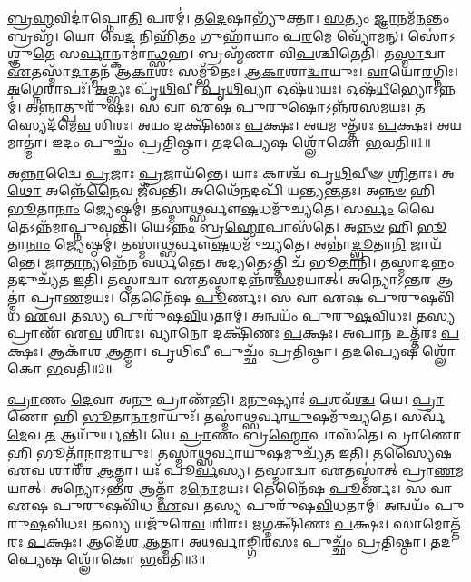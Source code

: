 \-\ul{𑌬𑍍𑌰}\-\-\ul{𑌹𑍍𑌮}\-𑌵𑌿𑌦𑌾॑𑌪𑍍𑌨𑍋\-\ul{𑌤𑌿} 𑌪𑌰𑌮𑍍॑। 
𑌤\-\ul{𑌦𑍇}\-𑌷𑌾𑌭𑍍𑌯𑍁᳴𑌕𑍍𑌤𑌾। 
\-\ul{𑌸}\-𑌤𑍍𑌯𑌂 \ul{𑌜𑍍𑌞𑌾}\-𑌨𑌮᳴\-\-\ul{𑌨}\-𑌨𑍍𑌤𑌂 𑌬𑍍𑌰𑌹𑍍𑌮᳴। 
𑌯𑍋 𑌵𑍇\-\ul{𑌦} 𑌨𑌿𑌹𑌿᳴\-\ul{𑌤𑌂} 𑌗𑍁𑌹𑌾᳴𑌯𑌾𑌂 𑌪\-\ul{𑌰}\-𑌮𑍇 𑌵𑍍𑌯𑍋᳴𑌮𑌨𑍍। 
𑌸𑍋॑𑌽𑌶𑍍𑌞𑍁\-\ul{𑌤𑍇} 𑌸\-\ul{𑌰𑍍𑌵𑌾}\-𑌨𑍍𑌕𑌾𑌮𑌾॑\-\ul{𑌨𑍍𑌥𑍍𑌸}\-𑌹। 
𑌬𑍍𑌰𑌹𑍍𑌮᳴𑌣𑌾 𑌵𑌿\-\-\ul{𑌪}\-𑌶𑍍𑌚𑌿𑌤𑍇𑌤𑌿᳴। 
𑌤\-\ul{𑌸𑍍𑌮𑌾}\-𑌦𑍍𑌵𑌾 \ul{𑌏}\-𑌤𑌸𑍍𑌮𑌾᳴\-\-\ul{𑌦𑌾}\-𑌤𑍍𑌮𑌨᳴ 𑌆\-\ul{𑌕𑌾}\-𑌶𑌃 𑌸𑌮𑍍𑌭𑍂᳴𑌤𑌃। 
\-\ul{𑌆}\-\-\ul{𑌕𑌾}\-𑌶𑌾\-\ul{𑌦𑍍𑌵𑌾}\-𑌯𑍁𑌃। 
\-\ul{𑌵𑌾}\-𑌯𑍋\-\ul{𑌰}\-𑌗𑍍𑌨𑌿𑌃। 
\-\ul{𑌅}\-𑌗𑍍𑌨𑍇𑌰𑌾𑌪𑌃᳴। 
\-\ul{𑌅}\-𑌦𑍍𑌭𑍍𑌯𑌃 𑌪𑍃᳴\-\ul{𑌥𑌿}\-𑌵𑍀। 
\-\ul{𑌪𑍃}\-\-\ul{𑌥𑌿}\-𑌵𑍍𑌯𑌾 𑌓𑌷᳴𑌧𑌯𑌃। 
𑌓𑌷᳴\-\ul{𑌧𑍀}\-𑌭𑍍𑌯𑍋\-𑌽\-𑌨𑍍𑌨𑌮𑍍॑। 
𑌅\-\ul{𑌨𑍍𑌨𑌾}\-𑌤𑍍𑌪𑍁𑌰𑍁᳴𑌷𑌃। 
𑌸 𑌵𑌾 𑌏𑌷 𑌪𑍁𑌰𑍁𑌷𑍋\-𑌽𑌨𑍍𑌨᳴\-𑌰\-\ul{𑌸}\-𑌮𑌯𑌃। 
𑌤𑌸𑍍𑌯𑍇𑌦᳴\-𑌮𑍇\-\ul{𑌵} 𑌶𑌿𑌰𑌃। 
𑌅𑌯𑌂 𑌦𑌕𑍍𑌷𑌿᳴𑌣𑌃 \ul{𑌪}\-𑌕𑍍𑌷𑌃। 
𑌅𑌯𑌮𑍁𑌤𑍍𑌤᳴𑌰𑌃 \ul{𑌪}\-𑌕𑍍𑌷𑌃। 
𑌅𑌯𑌮𑌾𑌤𑍍𑌮𑌾॑। 
𑌇𑌦𑌂 𑌪𑍁𑌚𑍍𑌛𑌂᳴ 𑌪𑍍𑌰𑌤𑌿\-॒𑌷𑍍𑌠𑌾। 
𑌤𑌦𑌪𑍍𑌯𑍇𑌷 𑌶𑍍𑌲𑍋᳴𑌕𑍋 \ul{𑌭}\-𑌵𑌤𑌿॥1॥

𑌅\-\ul{𑌨𑍍𑌨𑌾}\-𑌦𑍍𑌵𑍈 \ul{𑌪𑍍𑌰}\-𑌜𑌾𑌃 \ul{𑌪𑍍𑌰}\-𑌜𑌾𑌯᳴𑌨𑍍𑌤𑍇। 
𑌯𑌾𑌃 𑌕𑌾𑌶𑍍𑌚᳴ 𑌪𑍃\-\ul{𑌥𑌿}\-𑌵𑍀𑍟 \ul{𑌶𑍍𑌰𑌿}\-𑌤𑌾𑌃। 
𑌅\-\ul{𑌥𑍋} 𑌅𑌨𑍍𑌨𑍇᳴\-\ul{𑌨𑍈}\-𑌵 𑌜𑍀᳴𑌵𑌨𑍍𑌤𑌿। 
𑌅𑌥𑍈᳴\-\ul{𑌨}\-𑌦𑌪𑌿᳴ 𑌯𑌨𑍍𑌤𑍍𑌯\-\ul{𑌨𑍍𑌤}\-𑌤𑌃। 
𑌅\-\ul{𑌨𑍍𑌨}\-\-\ul{𑍞} 𑌹𑌿 \ul{𑌭𑍂}\-𑌤𑌾\-\ul{𑌨𑌾𑌂} 𑌜𑍍𑌯𑍇𑌷𑍍𑌠𑌮𑍍॑। 
𑌤𑌸𑍍𑌮𑌾॑𑌥𑍍𑌸𑌰𑍍𑌵𑍗\-\ul{𑌷}\-𑌧𑌮𑍁᳴𑌚𑍍𑌯𑌤𑍇। 
𑌸\-\ul{𑌰𑍍𑌵𑌂} 𑌵𑍈 𑌤𑍇𑌽𑌨𑍍𑌨᳴𑌮𑌾𑌪𑍍𑌨𑍁𑌵𑌨𑍍𑌤𑌿। 
𑌯𑍇𑌽\-\ul{𑌨𑍍𑌨𑌂} 𑌬𑍍𑌰\-\ul{𑌹𑍍𑌮𑍋}\-𑌪𑌾𑌸᳴𑌤𑍇। 
𑌅\-\ul{𑌨𑍍𑌨}\-\-\ul{𑍞} 𑌹𑌿 \ul{𑌭𑍂}\-𑌤𑌾\-\ul{𑌨𑌾𑌂} 𑌜𑍍𑌯𑍇𑌷𑍍𑌠𑌮𑍍॑। 
𑌤𑌸𑍍𑌮𑌾॑𑌥𑍍𑌸𑌰𑍍𑌵𑍗\-\ul{𑌷}\-𑌧𑌮𑍁᳴𑌚𑍍𑌯𑌤𑍇। 
𑌅𑌨𑍍𑌨𑌾॑\-\ul{𑌦𑍍𑌭𑍂}\-𑌤𑌾\-\ul{𑌨𑌿} 𑌜𑌾𑌯᳴𑌨𑍍𑌤𑍇। 
𑌜𑌾\-\ul{𑌤𑌾}\-𑌨𑍍𑌯𑌨𑍍𑌨𑍇᳴𑌨 𑌵𑌰𑍍𑌧𑌨𑍍𑌤𑍇। 
𑌅𑌦𑍍𑌯𑌤𑍇𑌽𑌤𑍍𑌤𑌿 𑌚᳴ 𑌭𑍂\-\ul{𑌤𑌾}\-𑌨𑌿। 
𑌤𑌸𑍍𑌮𑌾𑌦𑌨𑍍𑌨𑌂 𑌤𑌦𑍁𑌚𑍍𑌯᳴𑌤 \ul{𑌇}\-𑌤𑌿। 
𑌤𑌸𑍍𑌮𑌾𑌦𑍍𑌵𑌾 𑌏𑌤𑌸𑍍𑌮𑌾𑌦𑌨𑍍𑌨᳴𑌰\-\ul{𑌸}\-𑌮𑌯𑌾𑌤𑍍। 
𑌅𑌨𑍍𑌯𑍋𑌽𑌨𑍍𑌤𑌰 𑌆𑌤𑍍𑌮𑌾॑ 𑌪𑍍𑌰𑌾\-\ul{𑌣}\-𑌮𑌯𑌃। 
𑌤𑍇𑌨𑍈᳴𑌷 \ul{𑌪𑍂}\-𑌰𑍍𑌣𑌃। 
𑌸 𑌵𑌾 𑌏𑌷 𑌪𑍁𑌰𑍁𑌷𑌵𑌿᳴𑌧 \ul{𑌏}\-𑌵। 
𑌤𑌸𑍍𑌯 𑌪𑍁𑌰𑍁᳴𑌷\-\ul{𑌵𑌿}\-𑌧𑌤𑌾𑌮𑍍। 
𑌅𑌨𑍍𑌵𑌯𑌂᳴ 𑌪𑍁𑌰𑍁\-\ul{𑌷}\-𑌵𑌿𑌧𑌃। 
𑌤𑌸𑍍𑌯 𑌪𑍍𑌰𑌾𑌣᳴ 𑌏\-\ul{𑌵} 𑌶𑌿𑌰𑌃। 
𑌵𑍍𑌯𑌾𑌨𑍋 𑌦𑌕𑍍𑌷𑌿᳴𑌣𑌃 \ul{𑌪}\-𑌕𑍍𑌷𑌃। 
𑌅𑌪𑌾𑌨 𑌉𑌤𑍍𑌤᳴𑌰𑌃 \ul{𑌪}\-𑌕𑍍𑌷𑌃। 
𑌆𑌕𑌾᳴𑌶 \ul{𑌆}\-𑌤𑍍𑌮𑌾। 
𑌪𑍃𑌥𑌿𑌵𑍀 𑌪𑍁𑌚𑍍𑌛𑌂᳴ 𑌪𑍍𑌰𑌤𑌿\-॒𑌷𑍍𑌠𑌾। 
𑌤𑌦𑌪𑍍𑌯𑍇𑌷 𑌶𑍍𑌲𑍋᳴𑌕𑍋 \ul{𑌭}\-𑌵𑌤𑌿॥2॥

\-\ul{𑌪𑍍𑌰𑌾}\-𑌣𑌂 \ul{𑌦𑍇}\-𑌵𑌾 𑌅\-\ul{𑌨𑍁} 𑌪𑍍𑌰𑌾𑌣᳴𑌨𑍍𑌤𑌿। 
\-\ul{𑌮}\-\-\ul{𑌨𑍁}\-𑌷𑍍𑌯𑌾𑌃॑ \ul{𑌪}\-𑌶𑌵᳴\-\ul{𑌶𑍍𑌚} 𑌯𑍇। 
\-\ul{𑌪𑍍𑌰𑌾}\-𑌣𑍋 𑌹𑌿 \ul{𑌭𑍂}\-𑌤𑌾\-\ul{𑌨𑌾}\-𑌮𑌾𑌯𑍁𑌃᳴। 
𑌤𑌸𑍍𑌮𑌾॑𑌥𑍍𑌸𑌰𑍍𑌵𑌾\-\ul{𑌯𑍁}\-𑌷𑌮𑍁᳴𑌚𑍍𑌯𑌤𑍇। 
𑌸𑌰𑍍𑌵᳴\-\ul{𑌮𑍇}\-𑌵 \ul{𑌤} 𑌆𑌯𑍁᳴𑌰𑍍\mbox{}𑌯𑌨𑍍𑌤𑌿। 
𑌯𑍇 \ul{𑌪𑍍𑌰𑌾}\-𑌣𑌂 𑌬𑍍𑌰\-\ul{𑌹𑍍𑌮𑍋}\-𑌪𑌾𑌸᳴𑌤𑍇। 
𑌪𑍍𑌰𑌾𑌣𑍋 𑌹𑌿 𑌭𑍂𑌤𑌾᳴𑌨𑌾\-\ul{𑌮𑌾}\-𑌯𑍁𑌃। 
𑌤𑌸𑍍𑌮𑌾𑌥𑍍𑌸𑌰𑍍𑌵𑌾𑌯𑍁𑌷𑌮𑍁𑌚𑍍𑌯᳴𑌤 \ul{𑌇}\-𑌤𑌿। 
𑌤𑌸𑍍𑌯𑍈𑌷 𑌏𑌵 𑌶𑌾𑌰𑍀᳴𑌰 \ul{𑌆}\-𑌤𑍍𑌮𑌾। 
𑌯𑌃᳴ 𑌪𑍂\-\ul{𑌰𑍍𑌵}\-𑌸𑍍𑌯। 
𑌤𑌸𑍍𑌮𑌾𑌦𑍍𑌵𑌾 𑌏𑌤𑌸𑍍𑌮𑌾॑𑌤𑍍 𑌪𑍍𑌰𑌾\-\ul{𑌣}\-𑌮𑌯𑌾𑌤𑍍। 
𑌅𑌨𑍍𑌯𑍋𑌽𑌨𑍍𑌤𑌰 𑌆𑌤𑍍𑌮𑌾᳴ 𑌮\-\ul{𑌨𑍋}\-𑌮𑌯𑌃। 
𑌤𑍇𑌨𑍈᳴𑌷 \ul{𑌪𑍂}\-𑌰𑍍𑌣𑌃। 
𑌸 𑌵𑌾 𑌏𑌷 𑌪𑍁𑌰𑍁𑌷𑌵𑌿᳴𑌧 \ul{𑌏}\-𑌵। 
𑌤𑌸𑍍𑌯 𑌪𑍁𑌰𑍁᳴𑌷\-\ul{𑌵𑌿}\-𑌧𑌤𑌾𑌮𑍍। 
𑌅𑌨𑍍𑌵𑌯𑌂᳴ 𑌪𑍁𑌰𑍁\-\ul{𑌷}\-𑌵𑌿𑌧𑌃। 
𑌤𑌸𑍍𑌯 𑌯𑌜𑍁᳴𑌰𑍇\-\ul{𑌵} 𑌶𑌿𑌰𑌃। 
𑌋𑌗𑍍𑌦𑌕𑍍𑌷𑌿᳴𑌣𑌃 \ul{𑌪}\-𑌕𑍍𑌷𑌃। 
𑌸𑌾𑌮𑍋𑌤𑍍𑌤᳴𑌰𑌃 \ul{𑌪}\-𑌕𑍍𑌷𑌃। 
𑌆𑌦𑍇᳴𑌶 \ul{𑌆}\-𑌤𑍍𑌮𑌾। 
𑌅𑌥𑌰𑍍𑌵𑌾𑌙𑍍𑌗𑌿𑌰𑌸𑌃 𑌪𑍁𑌚𑍍𑌛𑌂᳴ 𑌪𑍍𑌰𑌤𑌿\-॒𑌷𑍍𑌠𑌾। 
𑌤𑌦𑌪𑍍𑌯𑍇𑌷 𑌶𑍍𑌲𑍋᳴𑌕𑍋 \ul{𑌭}\-𑌵𑌤𑌿॥3॥

